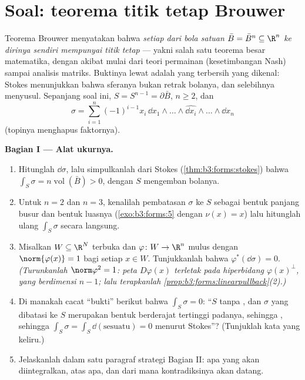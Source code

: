 \section{Soal: teorema titik tetap Brouwer}

\begin{problem}\label{pb:b3:forms:1}
Teorema Brouwer menyatakan bahwa \emph{setiap  dari
bola satuan  $\bar B = \bar B^n \subseteq \R^n$ ke
dirinya sendiri mempunyai titik tetap} --- yakni salah satu teorema besar
matematika, dengan akibat mulai dari teori permainan (kesetimbangan
Nash) sampai analisis matriks. Buktinya lewat 
adalah yang terbersih yang dikenal: Stokes menunjukkan bahwa sferanya bukan
retrak bolanya, dan selebihnya menyusul. Sepanjang soal ini,
$S = S^{n-1} = \partial\bar B$, $n \geq 2$, dan
\[
\sigma = \sum_{i=1}^n(-1)^{i-1}x_i\,
\dd x_1\wedge\dots\wedge\widehat{\dd x_i}\wedge\dots\wedge
\dd x_n
\]
(topinya menghapus faktornya).

\medskip
\noindent\textbf{Bagian I --- Alat ukurnya.}
\begin{enumerate}
  \item Hitunglah $\dd\sigma$, lalu simpulkanlah dari Stokes
        (\cref{thm:b3:forms:stokes}) bahwa $\int_S\sigma =
        n\operatorname{vol}(\bar B) > 0$, dengan $S$ mengemban
          bolanya.
  \item Untuk $n = 2$ dan $n = 3$, kenalilah pembatasan
        $\sigma$ ke $S$ sebagai bentuk panjang busur dan bentuk luasnya
        (\cref{exo:b3:forms:5} dengan $\nu(x) = x$) lalu
        hitunglah ulang $\int_S\sigma$ secara langsung.
  \item Misalkan $W \subseteq \R^N$ terbuka dan $\varphi\colon W
        \to \R^n$ mulus dengan $\norm{\varphi(x)} = 1$ bagi
        setiap $x \in W$. Tunjukkanlah bahwa
        $\varphi^*(\dd\sigma) = 0$. \emph{(Turunkanlah
        $\norm\varphi^2 = 1$: peta $D\varphi(x)$
        terletak pada hiperbidang $\varphi(x)^\perp$, yang
        berdimensi $n - 1$; lalu terapkanlah
        \cref{prop:b3:forms:linearpullback}(2).)}
  \item Di manakah cacat ``bukti'' berikut bahwa
        $\int_S\sigma = 0$: ``$S$  tanpa
        , dan $\sigma$ yang dibatasi ke $S$ merupakan bentuk
        berderajat tertinggi padanya, sehingga , sehingga $\int_S\sigma =
        \int_S\dd(\text{sesuatu}) = 0$ menurut Stokes''?
        (Tunjuklah kata yang keliru.)
  \item Jelaskanlah dalam satu paragraf strategi Bagian II:
        apa yang akan diintegralkan, atas apa, dan dari mana
        kontradiksinya akan datang.
\end{enumerate}


\end{problem}
